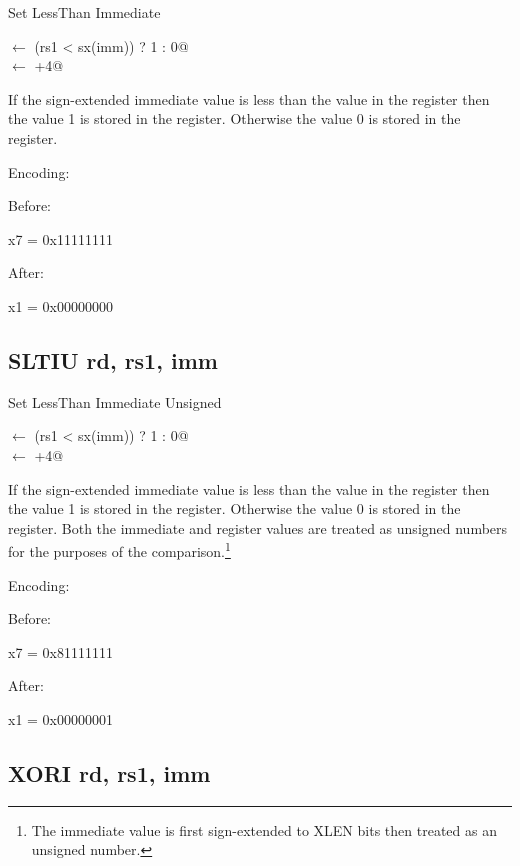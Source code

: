 Set LessThan Immediate

\verb@rd@ $\leftarrow$ \verb@(rs1 < sx(imm)) ? 1 : 0@\\
\verb@pc@ $\leftarrow$ \verb@pc+4@

If the sign-extended immediate value is less than the value
in the  register then the value 1 is stored in the 
 register.  Otherwise the value 0 is stored in the
 register. 

Encoding:


Before:

x7 = 0x11111111

After:

x1 = 0x00000000

\subsection{SLTIU rd, rs1, imm}

Set LessThan Immediate Unsigned

\verb@rd@ $\leftarrow$ \verb@(rs1 < sx(imm)) ? 1 : 0@\\
\verb@pc@ $\leftarrow$ \verb@pc+4@

If the sign-extended immediate value is less than the value
in the  register then the value 1 is stored in the 
 register.  Otherwise the value 0 is stored in the
 register.  Both the immediate and  register
values are treated as unsigned numbers for the purposes of the 
comparison.\footnote{The immediate value is first sign-extended to
XLEN bits then treated as an unsigned number.\cite[p.~14]{rvismv1v22:2017}}


Encoding:


Before:

x7 = 0x81111111

After:

x1 = 0x00000001

\subsection{XORI rd, rs1, imm}

